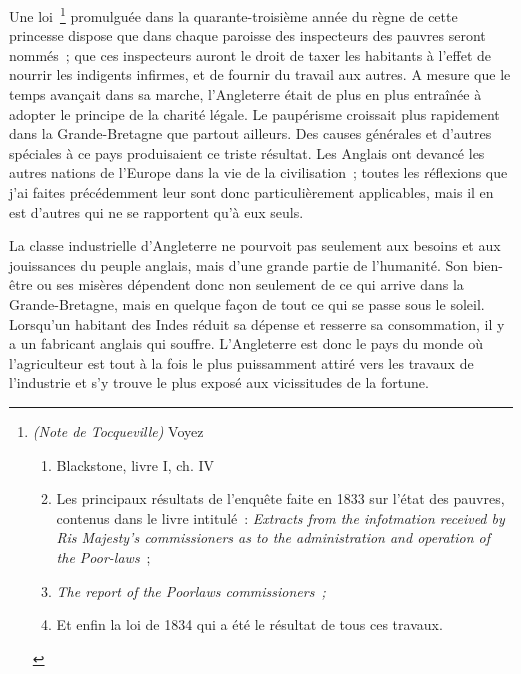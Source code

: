 \documentclass[french,twoside]{book} %
\begin{document}
Une loi \footnote{ \noindent \emph{(Note de Tocqueville)} Voyez\par
 
\begin{enumerate}[itemsep=0pt,]
\item Blackstone, livre I, ch. IV
\item Les principaux résultats de l’enquête faite en 1833 sur l’état des pauvres, contenus dans le livre intitulé : \emph{Extracts from the infotmation received by Ris Majesty's commissioners as to the administration and operation of the Poor-laws} ;
\item \emph{The report of the Poorlaws commissioners ;}
\item Et enfin la loi de 1834 qui a été le résultat de tous ces travaux.
\end{enumerate}

} promulguée dans la quarante-troisième année du règne de cette princesse dispose que dans chaque paroisse des inspecteurs des pauvres seront nommés ; que ces inspecteurs auront le droit de taxer les habitants à l’effet de nourrir les indigents infirmes, et de fournir du travail aux autres. A mesure que le temps avançait dans sa marche, l’Angleterre était de plus en plus entraînée à adopter le principe de la charité légale. Le paupérisme croissait plus rapidement dans la Grande-Bretagne que partout ailleurs. Des causes générales et d’autres spéciales à ce pays produisaient ce triste résultat. Les Anglais ont devancé les autres nations de l’Europe dans la vie de la civilisation ; toutes les réflexions que j’ai faites précédemment leur sont donc particulièrement applicables, mais il en est d’autres qui ne se rapportent qu’à eux seuls.\par
\bigbreak
\noindent La classe industrielle d’Angleterre ne pourvoit pas seulement aux besoins et aux jouissances du peuple anglais, mais d’une grande partie de l’humanité. Son bien-être ou ses misères dépendent donc non seulement de ce qui arrive dans la Grande-Bretagne, mais en quelque façon de tout ce qui se passe sous le soleil. Lorsqu’un habitant des Indes réduit sa dépense et resserre sa consommation, il y a un fabricant anglais qui souffre. L’Angleterre est donc le pays du monde où l’agriculteur est tout à la fois le plus puissamment attiré vers les travaux de l’industrie et s’y trouve le plus exposé aux vicissitudes de la fortune.\par
\end{document}
